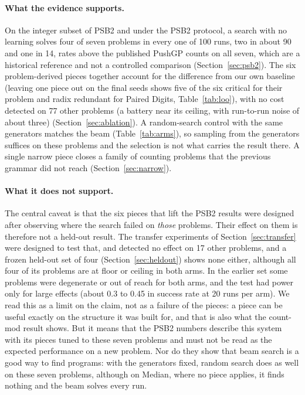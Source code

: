 \documentclass[sigconf,nonacm]{acmart}
\begin{document}
\paragraph{What the evidence supports.}
On the integer subset of PSB2 and under the PSB2 protocol, a search with no learning solves four of seven problems in every one of 100 runs, two in about 90 and one
in 14, rates above the published PushGP counts on all seven, which are a historical reference and not a controlled comparison (Section~\ref{sec:psb2}). The six problem-derived pieces together account for the difference from our own
baseline (leaving one piece out on the final seeds shows five of the six critical for their problem and radix redundant for Paired Digits, Table~\ref{tab:loo}), with no cost detected on 77 other problems (a battery near its ceiling, with run-to-run noise of about three) (Section~\ref{sec:ablation}). A random-search control with the same generators matches the beam (Table~\ref{tab:arms}), so sampling from the generators suffices on these problems and the selection is not what carries the result there. A single narrow piece closes a family of counting problems that the previous
grammar did not reach (Section~\ref{sec:narrow}).

\paragraph{What it does not support.}
The central caveat is that the six pieces that lift the PSB2 results were designed after observing where the search failed on \emph{those} problems. Their effect on
them is therefore not a held-out result. The transfer experiments of Section~\ref{sec:transfer} were designed to test that, and detected no effect on 17 other problems, and a frozen held-out set of four (Section~\ref{sec:heldout}) shows none either, although all four of its problems are at floor or ceiling in both arms. In the earlier set some problems were
degenerate or out of reach for both arms, and the test had power only for large effects (about 0.3 to 0.45 in success rate at 20 runs per arm). We read this as a limit on the claim, not as a failure of the pieces: a piece can be useful
exactly on the structure it was built for, and that is also what the count-mod result shows. But it means that the PSB2 numbers describe this system
with its pieces tuned to these seven problems and must not be read as the expected performance on a new problem. Nor do they show that beam search is a good way to find programs: with the generators fixed, random search does as well on these seven problems, although on Median, where no piece applies, it finds nothing and the beam solves every run.
\end{document}
